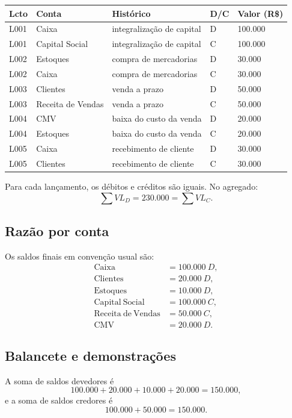 \documentclass[11pt,a4paper]{article}
\begin{document}
\begin{longtable}{p{} p{} p{} p{} p{}}
\toprule
\textbf{Lcto} & \textbf{Conta} & \textbf{Histórico} & \textbf{D/C} & \textbf{Valor (R\$)}\\
\midrule
L001 & Caixa & integralização de capital & D & 100.000\\
L001 & Capital Social & integralização de capital & C & 100.000\\
L002 & Estoques & compra de mercadorias & D & 30.000\\
L002 & Caixa & compra de mercadorias & C & 30.000\\
L003 & Clientes & venda a prazo & D & 50.000\\
L003 & Receita de Vendas & venda a prazo & C & 50.000\\
L004 & CMV & baixa do custo da venda & D & 20.000\\
L004 & Estoques & baixa do custo da venda & C & 20.000\\
L005 & Caixa & recebimento de cliente & D & 30.000\\
L005 & Clientes & recebimento de cliente & C & 30.000\\
\bottomrule
\end{longtable}

Para cada lançamento, os débitos e créditos são iguais. No agregado:
\[
\sum VL_D=230.000=\sum VL_C.
\]

\subsection{Razão por conta}

Os saldos finais em convenção usual são:
\begin{align*}
\mathrm{Caixa}&=100.000\ D,\\
\mathrm{Clientes}&=20.000\ D,\\
\mathrm{Estoques}&=10.000\ D,\\
\mathrm{Capital\ Social}&=100.000\ C,\\
\mathrm{Receita\ de\ Vendas}&=50.000\ C,\\
\mathrm{CMV}&=20.000\ D.
\end{align*}

\subsection{Balancete e demonstrações}

A soma de saldos devedores é
\[
100.000+20.000+10.000+20.000=150.000,
\]
e a soma de saldos credores é
\[
100.000+50.000=150.000.
\]
\end{document}

